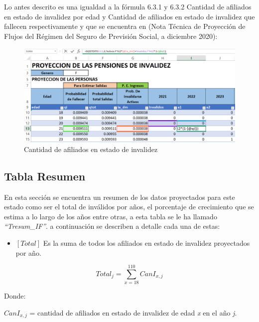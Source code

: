 \documentclass[
  letterpaper,
  DIV=11,
  numbers=noendperiod]{scrreprt}
\providecommand{\tightlist}{%
  \setlength{\itemsep}{0pt}\setlength{\parskip}{0pt}}\usepackage{longtable,booktabs,array}
\begin{document}
Lo antes descrito es una igualdad a la fórmula 6.3.1 y 6.3.2 Cantidad de
afiliados en estado de invalidez por edad y Cantidad de afiliados en
estado de invalidez que fallecen respectivamente y que se encuentra en
(Nota Técnica de Proyección de Flujos del Régimen del Seguro de
Previsión Social, a diciembre 2020):

\begin{figure}

{\centering \includegraphics{images/F/Img34.png}

}

\caption{Cantidad de afiliados en estado de invalidez}

\end{figure}

\hypertarget{tabla-resumen-2}{%
\subsection{Tabla Resumen}\label{tabla-resumen-2}}

En esta sección se encuentra un resumen de los datos proyectados para
este estado como ser el total de inválidos por años, el porcentaje de
crecimiento que se estima a lo largo de los años entre otras, a esta
tabla se le ha llamado \emph{``Tresum\_IF''}. a continuación se
describen a detalle cada una de estas:

\begin{itemize}
\tightlist
\item
  \([Total]\) Es la suma de todos los afiliados en estado de invalidez
  proyectados por año.
\end{itemize}

\begin{equation}
Total_j=\sum_{x=18}^{110}{C{anI}_{x,j}}
\end{equation}

Donde:

\(C{anI}_{x,j}\) = cantidad de afiliados en estado de invalidez de edad
\emph{x} en el año \emph{j}.
\end{document}
